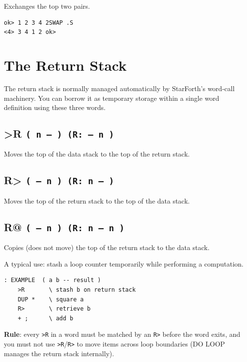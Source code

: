 Exchanges the top two pairs.

\begin{lstlisting}[language=Forth]
ok> 1 2 3 4 2SWAP .S
<4> 3 4 1 2 ok>
\end{lstlisting}

\section{The Return Stack}
\label{sec:return-stack}

The return stack is normally managed automatically by StarForth's word-call
machinery. You can borrow it as temporary storage within a single word
definition using these three words.

\subsection*{>R \texttt{( n -- ) (R: -- n )}}

Moves the top of the data stack to the top of the return stack.

\subsection*{R> \texttt{( -- n ) (R: n -- )}}

Moves the top of the return stack to the top of the data stack.

\subsection*{R@ \texttt{( -- n ) (R: n -- n )}}

Copies (does not move) the top of the return stack to the data stack.

A typical use: stash a loop counter temporarily while performing a computation.

\begin{lstlisting}[language=Forth]
: EXAMPLE  ( a b -- result )
    >R       \ stash b on return stack
    DUP *    \ square a
    R>       \ retrieve b
    + ;      \ add b
\end{lstlisting}

\textbf{Rule}: every \texttt{>R} in a word must be matched by an \texttt{R>}
before the word exits, and you must not use \texttt{>R}/\texttt{R>} to move
items across loop boundaries (DO LOOP manages the return stack internally).

